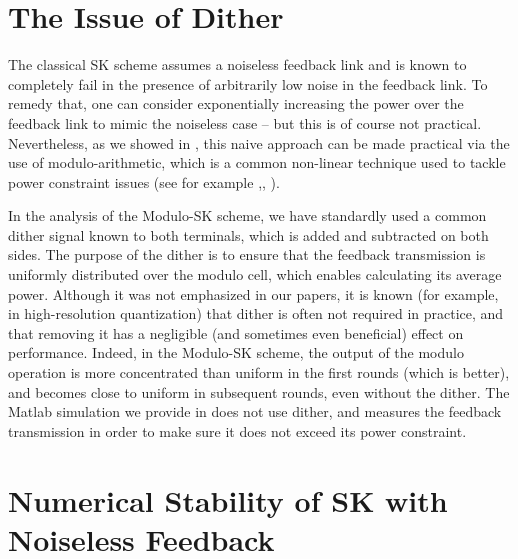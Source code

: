 \documentclass[article,onecolumn,11pt]{IEEEtran}
\begin{document}
\section{The Issue of Dither}
The classical SK scheme \cite{S-K_partII} assumes a noiseless feedback link and is known to completely fail in the presence of arbitrarily low noise in the feedback link. To remedy that, one can consider exponentially increasing the power over the feedback link to mimic the noiseless case -- but this is of course not practical. Nevertheless, as we showed in \cite{SimpleInteractionAllerton2014,ben2017interactive}, this naive approach can be made practical via the use of modulo-arithmetic, which is a common non-linear technique used to tackle power constraint issues (see for example \cite{Tomlinson},\cite{KochmanZamirJointWZWDP},
\cite{ErezShamaiZamir}).  

In the analysis of the Modulo-SK scheme, we have standardly used a common dither signal known to both terminals, which is added and subtracted on both sides. The purpose of the dither is to ensure that the feedback transmission is uniformly distributed over the modulo cell, which enables calculating its average power. Although it was not emphasized in our papers, it is known (for example, {in high-resolution quantization}) that dither is often not required in practice, and that removing it has a negligible (and sometimes even beneficial) effect on performance. 
Indeed, in the Modulo-SK scheme, the output of the modulo operation is more concentrated than uniform in the first rounds (which is better), and becomes close to uniform in subsequent rounds, even without the dither. The Matlab simulation we provide in \cite{ModuloSKcode} does not use dither, and measures the feedback transmission in order to make sure it does not exceed its power constraint.
\section{Numerical Stability of SK with Noiseless Feedback}
\end{document}
